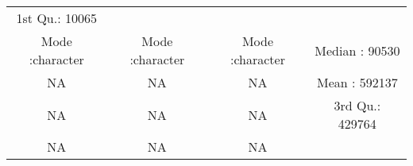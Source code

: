 \documentclass[
]{article}
\begin{document}
\begin{longtable}[]{@{}cccc@{}}
\begin{minipage}[t]{0.23\columnwidth}
1st Qu.: 10065\strut
\end{minipage}\tabularnewline
\begin{minipage}[t]{0.22\columnwidth}\centering
Mode :character\strut
\end{minipage} & \begin{minipage}[t]{0.22\columnwidth}\centering
Mode :character\strut
\end{minipage} & \begin{minipage}[t]{0.22\columnwidth}\centering
Mode :character\strut
\end{minipage} & \begin{minipage}[t]{0.23\columnwidth}\centering
Median : 90530\strut
\end{minipage}\tabularnewline
\begin{minipage}[t]{0.22\columnwidth}\centering
NA\strut
\end{minipage} & \begin{minipage}[t]{0.22\columnwidth}\centering
NA\strut
\end{minipage} & \begin{minipage}[t]{0.22\columnwidth}\centering
NA\strut
\end{minipage} & \begin{minipage}[t]{0.23\columnwidth}\centering
Mean : 592137\strut
\end{minipage}\tabularnewline
\begin{minipage}[t]{0.22\columnwidth}\centering
NA\strut
\end{minipage} & \begin{minipage}[t]{0.22\columnwidth}\centering
NA\strut
\end{minipage} & \begin{minipage}[t]{0.22\columnwidth}\centering
NA\strut
\end{minipage} & \begin{minipage}[t]{0.23\columnwidth}\centering
3rd Qu.: 429764\strut
\end{minipage}\tabularnewline
\begin{minipage}[t]{0.22\columnwidth}\centering
NA\strut
\end{minipage} & \begin{minipage}[t]{0.22\columnwidth}\centering
NA\strut
\end{minipage} & \begin{minipage}[t]{0.22\columnwidth}\centering
NA\strut
\end{minipage} & \begin{minipage}[t]{0.23\columnwidth}\centering

\end{minipage}
\end{longtable}
\end{document}
